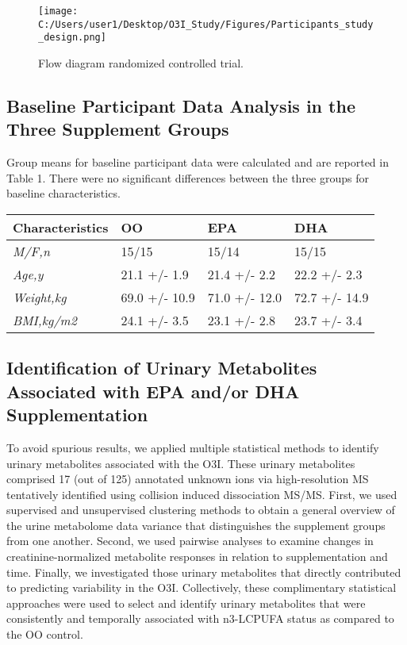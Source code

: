 \documentclass[journal=jacsat,manuscript=article]{achemso}
\begin{document}
\begin{figure}
\centering
\texttt{[image: C:/Users/user1/Desktop/O3I\_Study/Figures/Participants\_study\_design.png]}
\caption{Flow diagram randomized controlled trial.}
\end{figure}

\subsection{Baseline Participant Data Analysis in the Three Supplement
Groups}\label{baseline-participant-data-analysis-in-the-three-supplement-groups}

Group means for baseline participant data were calculated and are
reported in Table 1. There were no significant differences between the
three groups for baseline characteristics.

\begin{longtable}[]{@{}llll@{}}
\toprule\noalign{}
\textbf{Characteristics} & \textbf{OO} & \textbf{EPA} & \textbf{DHA} \\
\midrule\noalign{}
\endhead
\bottomrule\noalign{}
\endlastfoot
\emph{M/F,n} & 15/15 & 15/14 & 15/15 \\
\emph{Age,y} & 21.1 +/- 1.9 & 21.4 +/- 2.2 & 22.2 +/- 2.3 \\
\emph{Weight,kg} & 69.0 +/- 10.9 & 71.0 +/- 12.0 & 72.7 +/- 14.9 \\
\emph{BMI,kg/m2} & 24.1 +/- 3.5 & 23.1 +/- 2.8 & 23.7 +/- 3.4 \\
\end{longtable}

\subsection{Identification of Urinary Metabolites Associated with EPA
and/or DHA
Supplementation}\label{identification-of-urinary-metabolites-associated-with-epa-andor-dha-supplementation}

To avoid spurious results, we applied multiple statistical methods to
identify urinary metabolites associated with the O3I. These urinary
metabolites comprised 17 (out of 125) annotated unknown ions via
high-resolution MS tentatively identified using collision induced
dissociation MS/MS. First, we used supervised and unsupervised
clustering methods to obtain a general overview of the urine metabolome
data variance that distinguishes the supplement groups from one another.
Second, we used pairwise analyses to examine changes in
creatinine-normalized metabolite responses in relation to
supplementation and time. Finally, we investigated those urinary
metabolites that directly contributed to predicting variability in the
O3I. Collectively, these complimentary statistical approaches were used
to select and identify urinary metabolites that were consistently and
temporally associated with n3-LCPUFA status as compared to the OO
control.
\end{document}
